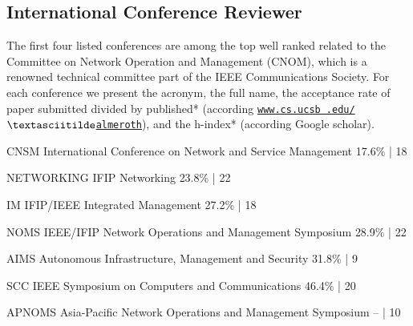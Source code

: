 \documentclass[]{friggeri-cv} %
\begin{document}
\subsection{International Conference Reviewer}
The first four listed conferences are among the top well ranked related to the Committee on Network Operation and Management (CNOM), which is a renowned technical committee part of the IEEE Communications Society. For each conference we present the acronym, the full name, the acceptance rate of paper submitted divided by published* (according \href{http://www.cs.ucsb .edu/~almeroth/conf/stats}{\texttt{www.cs.ucsb .edu/$\textasciitilde$almeroth}}), and the h-index* (according Google scholar).

\begin{entrylist}

\vspace{-0.3cm}
\entry
{CNSM} %
{International Conference on Network and Service Management}
{17.6\% | 18}

\vspace{-0.3cm}
\entry
{NETWORKING} %
{IFIP Networking}
{23.8\% | 22 }

\vspace{-0.3cm}
\entry
{IM} %
{IFIP/IEEE Integrated Management}
{27.2\% | 18}

\vspace{-0.3cm}
\entry
{NOMS} %
{IEEE/IFIP Network Operations and Management Symposium }
{28.9\% | 22}

\vspace{-0.3cm}
\entry
{AIMS} %
{Autonomous Infrastructure, Management and Security}
{31.8\% | 9}

\vspace{-0.3cm}
\entry
{SCC} %
{IEEE Symposium on Computers and Communications}
{46.4\% | 20}

\vspace{-0.3cm}
\entry
{APNOMS} %
{Asia-Pacific Network Operations and Management Symposium}
{ -- | 10}

\end{entrylist}

\let\thefootnote\relax{}


\newpage
\end{document}
